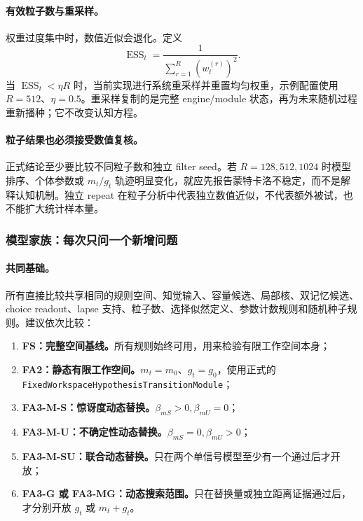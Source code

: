 \paragraph{有效粒子数与重采样。}
权重过度集中时，数值近似会退化。定义
\begin{equation}
\operatorname{ESS}_t
=\frac{1}{\sum_{r=1}^{R}(w^{(r)}_t)^2}.
\label{eq:model0809-ess}
\end{equation}
当 $\operatorname{ESS}_t<\eta R$ 时，当前实现进行系统重采样并重置均匀权重，示例配置使用 $R=512$、$\eta=0.5$。重采样复制的是完整 engine/module 状态，再为未来随机过程重新播种；它不改变认知方程。

\paragraph{粒子结果也必须接受数值复核。}
正式结论至少要比较不同粒子数和独立 filter seed。若 $R=128,512,1024$ 时模型排序、个体参数或 $m_t/g_t$ 轨迹明显变化，就应先报告蒙特卡洛不稳定，而不是解释认知机制。独立 repeat 在粒子分析中代表独立数值近似，不代表额外被试，也不能扩大统计样本量。


\subsubsection{模型家族：每次只问一个新增问题}

\paragraph{共同基础。}
所有直接比较共享相同的规则空间、知觉输入、容量候选、局部核、双记忆候选、choice readout、lapse 支持、粒子数、选择似然定义、参数计数规则和随机种子规则。建议依次比较：
\begin{enumerate}
    \item \textbf{FS：完整空间基线。}所有规则始终可用，用来检验有限工作空间本身；
    \item \textbf{FA2：静态有限工作空间。}$m_t=m_0$、$g_t=g_0$，使用正式的
    \texttt{FixedWorkspaceHypothesisTransitionModule}；
    \item \textbf{FA3-M-S：惊讶度动态替换。}$\beta_{mS}>0,\beta_{mU}=0$；
    \item \textbf{FA3-M-U：不确定性动态替换。}$\beta_{mS}=0,\beta_{mU}>0$；
    \item \textbf{FA3-M-SU：联合动态替换。}只在两个单信号模型至少有一个通过后才开放；
    \item \textbf{FA3-G 或 FA3-MG：动态搜索范围。}只在替换量或独立距离证据通过后，才分别开放 $g_t$ 或 $m_t+g_t$。
\end{enumerate}

